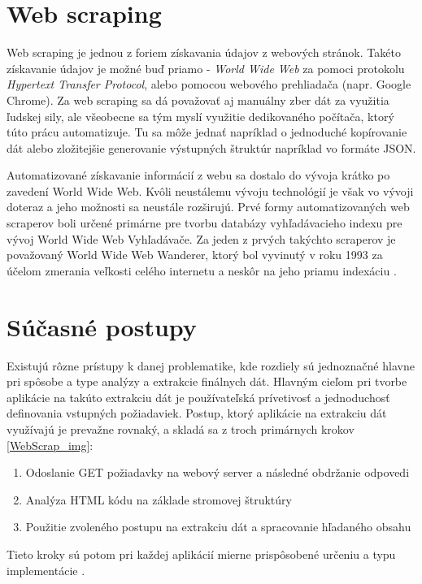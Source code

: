 \section{Web scraping}

Web scraping je jednou z foriem získavania údajov z webových stránok. Takéto získavanie údajov je možné buď priamo - \textit{World Wide Web} za pomoci protokolu \textit{Hypertext Transfer Protocol}, alebo pomocou webového prehliadača (napr. Google Chrome). Za web scraping sa dá považovať aj manuálny zber dát za využitia ľudskej sily, ale všeobecne sa tým myslí využitie dedikovaného počítača, ktorý túto prácu automatizuje. Tu sa môže jednať napríklad o jednoduché kopírovanie dát alebo zložitejšie generovanie výstupných štruktúr napríklad vo formáte JSON.

Automatizované získavanie informácií z webu sa dostalo do vývoja krátko po zavedení World Wide Web. Kvôli neustálemu vývoju technológií je však vo vývoji doteraz a jeho možnosti sa neustále rozširujú. Prvé formy automatizovaných web scraperov boli určené primárne pre tvorbu databázy vyhľadávacieho indexu pre vývoj World Wide Web Vyhľadávače. Za jeden z prvých takýchto scraperov je považovaný World Wide Web Wanderer, ktorý bol vyvinutý v roku 1993 za účelom zmerania veľkosti celého internetu a neskôr na jeho priamu indexáciu \cite{online:how_does_scraping_work}. 

\section{Súčasné postupy}

Existujú rôzne prístupy k danej problematike, kde rozdiely sú jednoznačné hlavne pri spôsobe a type analýzy a extrakcie finálnych dát. Hlavným cieľom pri tvorbe aplikácie na takúto extrakciu dát je používateľská prívetivosť a jednoduchosť definovania vstupných požiadaviek. Postup, ktorý aplikácie na extrakciu dát využívajú je prevažne rovnaký, a skladá sa z troch primárnych krokov \ref{WebScrap_img}:
\begin{enumerate}
  \item{Odoslanie GET požiadavky na webový server a následné obdržanie odpovedi}
  \item{Analýza HTML kódu na základe stromovej štruktúry}
  \item{Použitie zvoleného postupu na extrakciu dát a spracovanie hľadaného obsahu}
\end{enumerate}

Tieto kroky sú potom pri každej aplikácií mierne prispôsobené určeniu a typu implementácie \cite{online:how_does_scraping_work}. 

